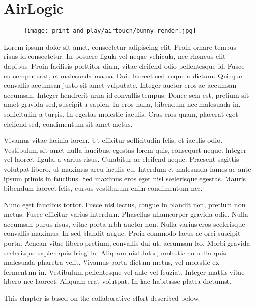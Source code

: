 \chapter{AirLogic}
  \begin{figure}[h]
    \centering
    \texttt{[image: print-and-play/airtouch/bunny\_render.jpg]}
  \end{figure}

  Lorem ipsum dolor sit amet, consectetur adipiscing elit. Proin ornare tempus
  risus id consectetur. In posuere ligula vel neque vehicula, nec rhoncus elit
  dapibus. Proin facilisis porttitor diam, vitae eleifend odio pellentesque id.
  Fusce eu semper erat, et malesuada massa. Duis laoreet sed neque a dictum.
  Quisque convallis accumsan justo sit amet vulputate. Integer auctor eros ac
  accumsan accumsan. Integer hendrerit urna id convallis tempus. Donec sem est,
  pretium sit amet gravida sed, suscipit a sapien. In eros nulla, bibendum nec
  malesuada in, sollicitudin a turpis. In egestas molestie iaculis. Cras eros
  quam, placerat eget eleifend sed, condimentum sit amet metus.

  Vivamus vitae lacinia lorem. Ut efficitur sollicitudin felis, et iaculis odio.
  Vestibulum sit amet nulla faucibus, egestas lorem quis, consequat neque.
  Integer vel laoreet ligula, a varius risus. Curabitur ac eleifend neque.
  Praesent sagittis volutpat libero, ut maximus arcu iaculis eu. Interdum et
  malesuada fames ac ante ipsum primis in faucibus. Sed maximus eros eget nisl
  scelerisque egestas. Mauris bibendum laoreet felis, cursus vestibulum enim
  condimentum nec.

  Nunc eget faucibus tortor. Fusce nisl lectus, congue in blandit non, pretium
  non metus. Fusce efficitur varius interdum. Phasellus ullamcorper gravida
  odio. Nulla accumsan purus risus, vitae porta nibh auctor non. Nulla varius
  eros scelerisque convallis maximus. In sed blandit augue. Proin commodo lacus
  ac orci suscipit porta. Aenean vitae libero pretium, convallis dui ut,
  accumsan leo. Morbi gravida scelerisque sapien quis fringilla. Aliquam nisl
  dolor, molestie eu nulla quis, malesuada pharetra velit. Vivamus porta dictum
  metus, vel molestie ex fermentum in. Vestibulum pellentesque vel ante vel
  feugiat. Integer mattis vitae libero nec laoreet. Aliquam erat volutpat. In
  hac habitasse platea dictumst.

  \newpage

  This chapter is based on the collaborative effort described below.

